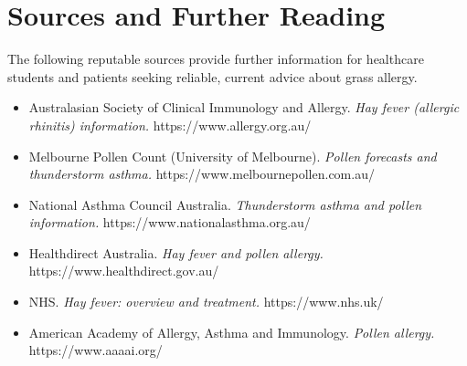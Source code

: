 \section*{Sources and Further Reading}
The following reputable sources provide further information for healthcare students and patients seeking reliable, current advice about grass allergy.

\begin{itemize}
    \item Australasian Society of Clinical Immunology and Allergy. \textit{Hay fever (allergic rhinitis) information.} https://www.allergy.org.au/
    \item Melbourne Pollen Count (University of Melbourne). \textit{Pollen forecasts and thunderstorm asthma.} https://www.melbournepollen.com.au/
    \item National Asthma Council Australia. \textit{Thunderstorm asthma and pollen information.} https://www.nationalasthma.org.au/
    \item Healthdirect Australia. \textit{Hay fever and pollen allergy.} https://www.healthdirect.gov.au/
    \item NHS. \textit{Hay fever: overview and treatment.} https://www.nhs.uk/
    \item American Academy of Allergy, Asthma and Immunology. \textit{Pollen allergy.} https://www.aaaai.org/
\end{itemize}
